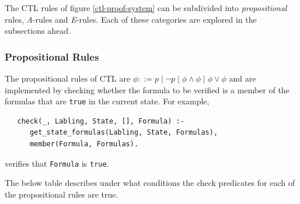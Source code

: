 \documentclass[a4paper, 11pt]{article}
\begin{document}
   The CTL rules of figure \ref{ctl-proof-system} can be 
   subdivided into \textit{propositional} rules, 
   \textit{A}-rules and \textit{E}-rules. Each of these 
   categories are explored in the subsections ahead.

   \subsubsection{Propositional Rules}
   \label{propositional-rules}
   The propositional rules of CTL are 
   $\phi ::= p \mid \neg p \mid \phi \wedge \phi \mid \phi
   \vee \phi$
   and are implemented by checking whether the formula to be
   verified is a member of the formulas that are \texttt{true}
   in the current state. For example,

\begin{verbatim}
   check(_, Labling, State, [], Formula) :-
      get_state_formulas(Labling, State, Formulas),
      member(Formula, Formulas).
\end{verbatim}

   verifies that \texttt{Formula} is \texttt{true}.
   \bigbreak

   The below table describes under what conditions the check
   predicates for each of the propositional rules are true.
   \bigbreak
\end{document}
